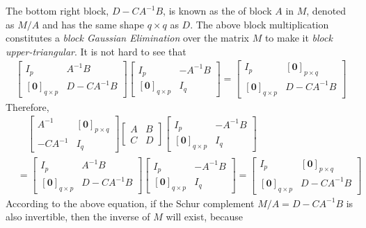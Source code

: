 The bottom right block, $D - CA^{-1}B$, is known as the  of block $A$ in $M$, denoted as $M/A$ and has the same shape $q \times q$ as $D$. The above block multiplication constitutes a \textit{block Gaussian Elimination} over the matrix $M$ to make it \textit{block upper-triangular}. It is not hard to see that
\begin{align*}
\begin{bmatrix}
I_p & A^{-1}B \\
[\textbf{0}]_{q\times p} & D - CA^{-1}B 
\end{bmatrix}
\begin{bmatrix}
I_p & -A^{-1}B \\
[\textbf{0}]_{q \times p} & I_q
\end{bmatrix}
=
\begin{bmatrix}
I_p & [\textbf{0}]_{p \times q} \\
[\textbf{0}]_{q\times p} & D - CA^{-1}B 
\end{bmatrix}
\end{align*}
Therefore,
\begin{align*}
&\quad \begin{bmatrix}
A^{-1} & [\textbf{0}]_{p\times q} \\
-CA^{-1} & I_q
\end{bmatrix}
\begin{bmatrix}
A & B \\
C & D
\end{bmatrix}
\begin{bmatrix}
I_p & -A^{-1}B \\
[\textbf{0}]_{q \times p} & I_q
\end{bmatrix} \\
&= \begin{bmatrix}
I_p & A^{-1}B \\
[\textbf{0}]_{q\times p} & D - CA^{-1}B 
\end{bmatrix}
\begin{bmatrix}
I_p & -A^{-1}B \\
[\textbf{0}]_{q \times p} & I_q
\end{bmatrix}
=
\begin{bmatrix}
I_p & [\textbf{0}]_{p \times q} \\
[\textbf{0}]_{q\times p} & D - CA^{-1}B 
\end{bmatrix}
\end{align*}
According to the above equation, if the Schur complement $M/A = D-CA^{-1}B$ is also invertible, then the inverse of $M$ will exist, because
